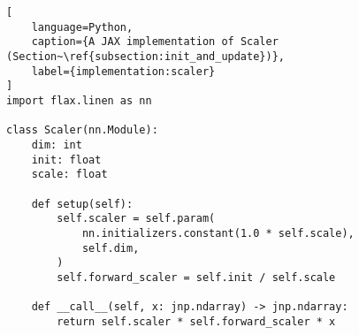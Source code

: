 \begin{lstlisting}[
    language=Python,
    caption={A JAX implementation of Scaler (Section~\ref{subsection:init_and_update})},
    label={implementation:scaler}
]
import flax.linen as nn

class Scaler(nn.Module):
    dim: int
    init: float
    scale: float

    def setup(self):
        self.scaler = self.param(
            nn.initializers.constant(1.0 * self.scale),
            self.dim,
        )
        self.forward_scaler = self.init / self.scale

    def __call__(self, x: jnp.ndarray) -> jnp.ndarray:
        return self.scaler * self.forward_scaler * x
\end{lstlisting}
\vspace{5mm}
